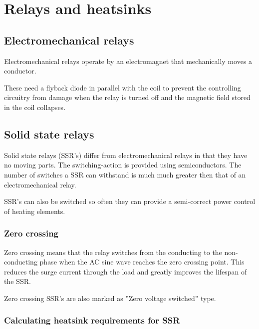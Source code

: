\documentclass[11pt,fleqn,openany]{book} %
\begin{document}


\chapter{Relays and heatsinks}

\section{Electromechanical relays}

Electromechanical relays operate by an electromagnet that mechanically moves a conductor.

These need a flyback diode in parallel with the coil to prevent the controlling circuitry from damage when the relay is turned off and the magnetic field stored in the coil collapses. 

\section{Solid state relays}

Solid state relays (SSR's) differ from electromechanical relays in that they have no moving parts. The switching-action is provided using semiconductors. The number of switches a SSR can withstand is much much greater then that of an electromechanical relay.

SSR's can also be switched so often they can provide a semi-correct power control of heating elements. 

\subsection{Zero crossing}

Zero crossing means that the relay switches from the conducting to the non-conducting phase when the AC sine wave reaches the zero crossing point. This reduces the surge current through the load and greatly improves the lifespan of the SSR.

Zero crossing SSR's are also marked as ''Zero voltage switched'' type.

\subsection{Calculating heatsink requirements for SSR}
\end{document}
